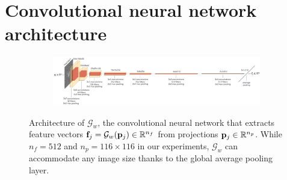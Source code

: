 \section{Convolutional neural network architecture}\label{apx:siamese-architecture}

\begin{figure}[ht!]
    \centering
    \begin{subfigure}[t]{1.0\linewidth}
        \includegraphics[width=\linewidth]{figures/architecture2.pdf}
    \end{subfigure}
    \caption{%
        Architecture of $\mathcal{G}_w$, the convolutional neural network that extracts feature vectors $\mathbf{f}_j = \mathcal{G}_w(\mathbf{p}_j) \in \mathbb{R}^{n_f}$ from projections $\mathbf{p}_j \in \mathbb{R}^{n_p}$.
        While $n_f=512$ and $n_p=116 \times 116$ in our experiments, $\mathcal{G}_w$ can accommodate any image size thanks to the global average pooling layer.
    }\label{fig:de-architecture}
\end{figure}
